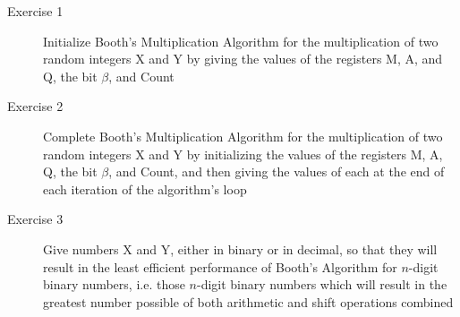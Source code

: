 \documentclass{article}
\begin{document}
\begin{description}
    \item [Exercise 1] Initialize Booth's Multiplication Algorithm for the multiplication of two random integers X and Y by giving the values of the registers M, A, and Q, the bit $\beta$, and Count
    \item [Exercise 2] Complete Booth's Multiplication Algorithm for the multiplication of two random integers X and Y by initializing the values of the registers M, A, Q, the bit $\beta$, and Count, and then giving the values of each at the end of each iteration of the algorithm's loop
    \item [Exercise 3] Give numbers X and Y, either in binary or in decimal, so that they will result in the least efficient performance of Booth's Algorithm for $n$-digit binary numbers, i.e. those $n$-digit binary numbers which will result in the greatest number possible of both arithmetic and shift operations combined
\end{description}





%
%
\end{document}
